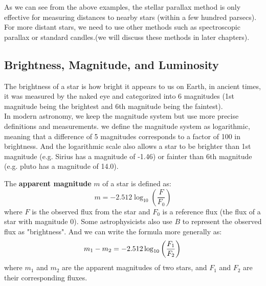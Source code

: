 \begin{remark}
    As we can see from the above examples, the stellar parallax method is only effective for measuring distances to nearby stars (within a few hundred parsecs). For more distant stars, we need to use other methods such as spectroscopic parallax or standard candles.(we will discuss these methods in later chapters).
\end{remark}

\bigskip\noindent \bigskip\noindent \bigskip\noindent
\subsection{Brightness, Magnitude, and Luminosity}
\begin{intuition}
    The brightness of a star is how bright it appears to us on Earth, in ancient times, it was measured by the naked eye and categorized into 6 magnitudes (1st magnitude being the brightest and 6th magnitude being the faintest). \\

    In modern astronomy, we keep the magnitude system but use more precise definitions and measurements. we define the magnitude system as logarithmic, meaning that a difference of 5 magnitudes corresponds to a factor of 100 in brightness. And the logarithmic scale also allows a star to be brighter than 1st magnitude (e.g. Sirius has a magnitude of -1.46) or fainter than 6th magnitude (e.g. pluto has a magnitude of 14.0).
\end{intuition}

\bigskip\noindent
\begin{theory}
    The \textbf{apparent magnitude} $m$ of a star is defined as:
    \begin{equation}
        m = -2.512 \log_{10}\left(\frac{F}{F_0}\right)
    \end{equation}
    where $F$ is the observed flux from the star and $F_0$ is a reference flux (the flux of a star with magnitude 0). Some astrophysicists also use $B$ to represent the observed flux as "brightness". And we can write the formula more generally as:
    \begin{equation}
        m_1 - m_2 = -2.512 \log_{10}\left(\frac{F_1}{F_2}\right) \\
    \end{equation}
    where $m_1$ and $m_2$ are the apparent magnitudes of two stars, and $F_1$ and $F_2$ are their corresponding fluxes. \\
\end{theory}

